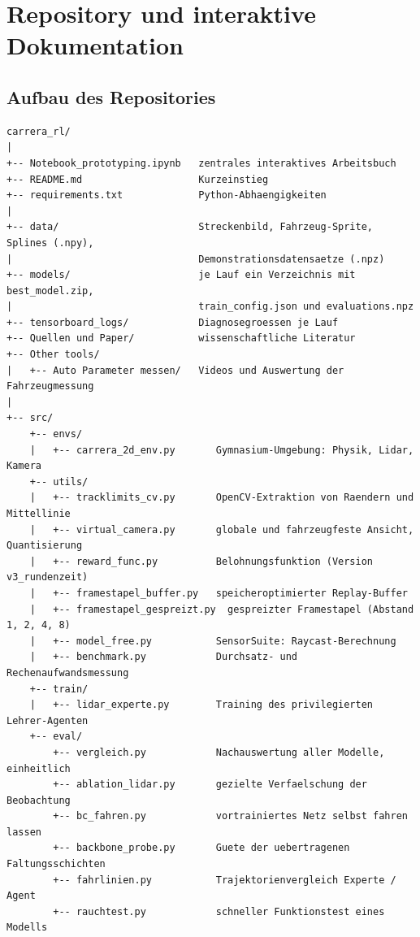 \chapter{Repository und interaktive Dokumentation}
\label{chap:anhang_a}

\section{Aufbau des Repositories}

\begin{lstlisting}[caption={Verzeichnisstruktur des Projekt-Repositories.},label={lst:repo}]
carrera_rl/
|
+-- Notebook_prototyping.ipynb   zentrales interaktives Arbeitsbuch
+-- README.md                    Kurzeinstieg
+-- requirements.txt             Python-Abhaengigkeiten
|
+-- data/                        Streckenbild, Fahrzeug-Sprite, Splines (.npy),
|                                Demonstrationsdatensaetze (.npz)
+-- models/                      je Lauf ein Verzeichnis mit best_model.zip,
|                                train_config.json und evaluations.npz
+-- tensorboard_logs/            Diagnosegroessen je Lauf
+-- Quellen und Paper/           wissenschaftliche Literatur
+-- Other tools/
|   +-- Auto Parameter messen/   Videos und Auswertung der Fahrzeugmessung
|
+-- src/
    +-- envs/
    |   +-- carrera_2d_env.py       Gymnasium-Umgebung: Physik, Lidar, Kamera
    +-- utils/
    |   +-- tracklimits_cv.py       OpenCV-Extraktion von Raendern und Mittellinie
    |   +-- virtual_camera.py       globale und fahrzeugfeste Ansicht, Quantisierung
    |   +-- reward_func.py          Belohnungsfunktion (Version v3_rundenzeit)
    |   +-- framestapel_buffer.py   speicheroptimierter Replay-Buffer
    |   +-- framestapel_gespreizt.py  gespreizter Framestapel (Abstand 1, 2, 4, 8)
    |   +-- model_free.py           SensorSuite: Raycast-Berechnung
    |   +-- benchmark.py            Durchsatz- und Rechenaufwandsmessung
    +-- train/
    |   +-- lidar_experte.py        Training des privilegierten Lehrer-Agenten
    +-- eval/
        +-- vergleich.py            Nachauswertung aller Modelle, einheitlich
        +-- ablation_lidar.py       gezielte Verfaelschung der Beobachtung
        +-- bc_fahren.py            vortrainiertes Netz selbst fahren lassen
        +-- backbone_probe.py       Guete der uebertragenen Faltungsschichten
        +-- fahrlinien.py           Trajektorienvergleich Experte / Agent
        +-- rauchtest.py            schneller Funktionstest eines Modells
\end{lstlisting}

